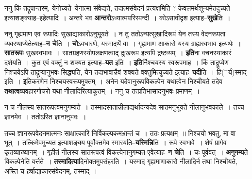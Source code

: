 \documentclass[article,12pt,a4paper]{memoir}
\newcommand{\add}[1]{($^{+}$#1)}
\begin{document}
	  \pstart ननु किं तद्रूपान्तरम्, येनोच्यते--येनात्मा संवेद्यते, तदात्मसंवेदनं प्रत्यक्षमिति ? केवलमर्थशून्यमेतदुच्यते इत्याशङ्क्याह--इहेत्यादि । अन्तरे भव \textbf{आन्तरो}ऽध्यात्मपरिस्पन्दी । कोऽसावीदृश इत्याह--\textbf{सुखे}ति ।
	\pend
      

	  \pstart ननु गृह्यमाण एव रूपादिः सुखाद्याकारोऽनुभूयते । न तु ततोऽन्यत्सुखादिरूपं येन तस्य वेदनरूपता व्यवस्थाप्येतेत्याह--\textbf{न चे}ति । \textbf{चो}ऽवधारणे, यस्मादर्थे वा । गृह्यमाण आकारो यस्य ग्राह्यस्वभाव इत्यर्थः । \textbf{सातरूपः} सुखस्वभावः । सातग्रहणस्योपलक्षणत्वाद् दुःखरूप इत्यपि द्रष्टव्यम् । \textbf{इति}ना वचनस्याकारं दर्शयति । कुत एवं वक्तुं न शक्यत इत्याह--\textbf{यत} इति । \textbf{इति}र्निश्चयस्य स्वरूपमाह । किं ताद्रूप्येण निश्चयेऽपि ताद्रूप्यानुभवः सिद्ध्यति, येन तदाभावान्नैवं शक्यते वक्तुमित्युच्यते इत्याह--\textbf{यदी}ति । हि\add{र्य}स्माद् इति । \textbf{इ}तिकरणेन निश्चयस्वरूपमुक्तम् । अनेन यदेवानुरूपविकल्पेन यथात्वेन निश्चीयते तदेव \textbf{तथात्व}व्यवहारगोचरो यथा नीलादिरित्याकूतम् । ननु च तत्प्रतिभासादनुभवः प्रमाणम् ।  \leavevmode{} 
	  
	न च नीलस्य सातरूपत्वमनुगम्यते । तस्मादसातान्नीलाद्यर्थादन्यदेव सातमनुभूयते नीलानुभवकाले । तच्च ज्ञानमेव । ततोऽस्ति ज्ञानानुभवः ।  
	  
	तच्च ज्ञानरूपवेदनमात्मनः साक्षात्कारि निर्विकल्पकमभ्रान्तं च । ततः प्रत्यक्षम् ॥ निश्चयो भवतु, मा वा भूत् । तत्किमेवमुच्यत इत्याशङ्क्य पूर्वोक्तमेव स्मारयति--\textbf{यस्मिन्नि}ति । रूपे स्वभावे । शेषं प्रागेव कृतव्याख्यानम् । गृहीतं नीलस्य सातरूपत्वं विकल्पेनानुगम्यत एवेत्याह--\textbf{न चे}ति । चः पूर्ववत् । \textbf{अनुगम्य}ते विकल्पेनेति वर्त्तते । \textbf{तस्मादित्या}दिनोक्तमुपसंहरति । यस्माद् गृह्यमाणाकारो नीलादिर्न तथा निश्चीयते, अस्ति च हर्षाद्याकारसंवेदनम्, तस्माद् ।
	\pend
      
\end{document}
